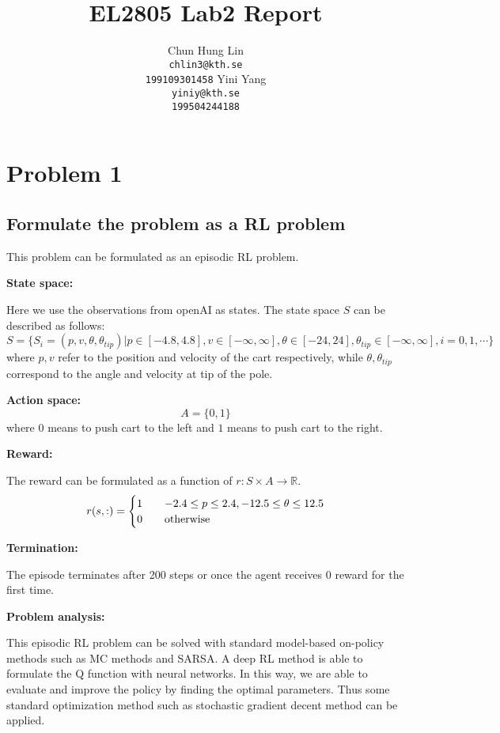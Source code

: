 \documentclass{article}
\title{EL2805 Lab2 Report}
\author{
  Chun Hung Lin \\
  \texttt{chlin3@kth.se} \\
  \texttt{199109301458}
  \And
  Yini Yang \\
  \texttt{yiniy@kth.se} \\
  \texttt{199504244188}
}
\begin{document}
\maketitle

\section{Problem 1}

\subsection{Formulate the problem as a RL problem}

This problem can be formulated as an episodic RL problem.

\textbf{State space:}

Here we use the observations from openAI as states. The state space $S$ can be described as follows:
$$ S = \{S_i=(p,v,\theta,\theta_{tip})|p\in[-4.8,4.8],v\in[-\infty,\infty],\theta\in[-24,24],\theta_{tip}\in[-\infty,\infty],i=0,1,\cdots\}$$
where $p,v$ refer to the position and velocity of the cart respectively, while $\theta,\theta_{tip}$ correspond to the angle and velocity at tip of the pole.

\textbf{Action space:}
$$A=\{0,1\}$$
where $0$ means to push cart to the left and $1$ means to push cart to the right.

\textbf{Reward:}

The reward can be formulated as a function of $r: S\times A\rightarrow \mathbb{R}$.
\begin{equation*}
  r(s, :) =
  \begin{cases}
    1  \quad &-2.4\leq p\leq 2.4, -12.5\leq \theta \leq 12.5\\
    0    \quad &\textup{otherwise}
  \end{cases}
\end{equation*}

\textbf{Termination:}

The episode terminates after 200 steps or once the agent receives 0 reward for the first time.

\textbf{Problem analysis:}

This episodic RL problem can be solved with standard model-based on-policy methods such as MC methods and SARSA.
A deep RL method is able to formulate the Q function with neural networks. In this way, we are able to evaluate and
improve the policy by finding the optimal parameters. Thus some standard optimization method such as stochastic gradient
decent method can be applied.
\end{document}
